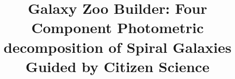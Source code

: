 \documentclass[trackchanges]{aastex63}
\begin{document}
\title{Galaxy Zoo Builder: Four Component Photometric decomposition of Spiral Galaxies Guided by Citizen Science}


\end{document}
